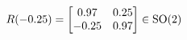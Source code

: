 \documentclass[preview]{standalone}
\begin{document}
\begin{align*}
\special{dvisvgm:raw <g id='unique000'>}R(-0.25) = \begin{bmatrix} 0.97 & 0.25 \\ -0.25 & 0.97 \end{bmatrix} \in \text{SO}(2)\special{dvisvgm:raw </g>}
\end{align*}
\end{document}
